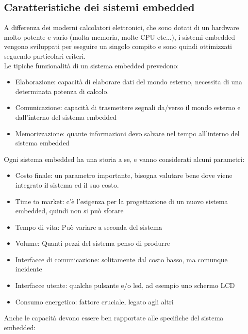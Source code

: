 \documentclass[12pt, oneside]{extbook}
\begin{document}
\subsection{Caratteristiche dei sistemi embedded}
A differenza dei moderni calcolatori elettronici, che sono dotati di un hardware molto potente e vario (molta memoria, molte CPU etc...), i sistemi embedded vengono sviluppati per eseguire un singolo compito e sono quindi ottimizzati seguendo particolari criteri.\\ Le tipiche funzionalità di un sistema embedded prevedono:
\begin{itemize}
\item Elaborazione: capacità di elaborare dati del mondo esterno, necessita di una determinata potenza di calcolo.
\item Comunicazione: capacità di trasmettere segnali da/verso il mondo esterno e dall'interno del sistema embedded
\item Memorizzazione: quante informazioni devo salvare nel tempo all'interno del sistema embedded
\end{itemize}
Ogni sistema embedded ha una storia a se, e vanno considerati alcuni parametri:
\begin{itemize}
\item Costo finale: un parametro importante, bisogna valutare bene dove viene integrato il sistema ed il suo costo.
\item Time to market: c'è l'esigenza per la progettazione di un nuovo sistema embedded, quindi non si può sforare
\item Tempo di vita: Può variare a seconda del sistema
\item Volume: Quanti pezzi del sistema penso di produrre
\item Interfacce di comunicazione: solitamente dal costo basso, ma comunque incidente
\item Interfacce utente: qualche pulsante e/o led, ad esempio uno schermo LCD
\item Consumo energetico: fattore cruciale, legato agli altri
\end{itemize}
Anche le capacità devono essere ben rapportate alle specifiche del sistema embedded:
\end{document}
